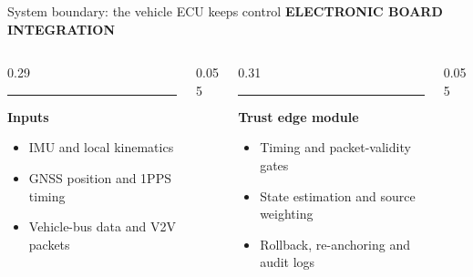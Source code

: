 \documentclass[aspectratio=169,11pt,xcolor=table]{beamer}
\newcommand{\eyebrow}[1]{%
  {\color{BrandCyan}\fontsize{7.5}{9}\selectfont\bfseries\MakeUppercase{#1}}\par\vspace{0.13cm}%
}
\begin{document}
\begin{frame}{System boundary: the vehicle ECU keeps control}
  \eyebrow{Electronic board integration}
  \vspace{0.04cm}
  \begin{columns}[T,onlytextwidth]
    \begin{column}{0.29\textwidth}
      {\color{BrandCyan}\rule{\linewidth}{0.09cm}}\par
      \vspace{0.12cm}
      {\color{BrandBlue}\fontsize{12.5}{14.5}\selectfont\bfseries Inputs}\par
      \vspace{0.14cm}
      {\fontsize{9.1}{10.9}\selectfont
      \begin{itemize}
        \item IMU and local kinematics
        \item GNSS position and 1PPS timing
        \item Vehicle-bus data and V2V packets
      \end{itemize}}
    \end{column}
    \begin{column}{0.055\textwidth}
      \vspace{1.28cm}\centering{\color{Rule}\fontsize{23}{25}\selectfont$\rightarrow$}
    \end{column}
    \begin{column}{0.31\textwidth}
      {\color{BrandMagenta}\rule{\linewidth}{0.09cm}}\par
      \vspace{0.12cm}
      {\color{BrandMagenta}\fontsize{12.5}{14.5}\selectfont\bfseries Trust edge module}\par
      \vspace{0.14cm}
      {\fontsize{9.1}{10.9}\selectfont
      \begin{itemize}
        \item Timing and packet-validity gates
        \item State estimation and source weighting
        \item Rollback, re-anchoring and audit logs
      \end{itemize}}
    \end{column}
    \begin{column}{0.055\textwidth}
      \vspace{1.28cm}\centering{\color{Rule}\fontsize{23}{25}\selectfont$\rightarrow$}

\end{column}
\end{columns}
\end{frame}
\end{document}
